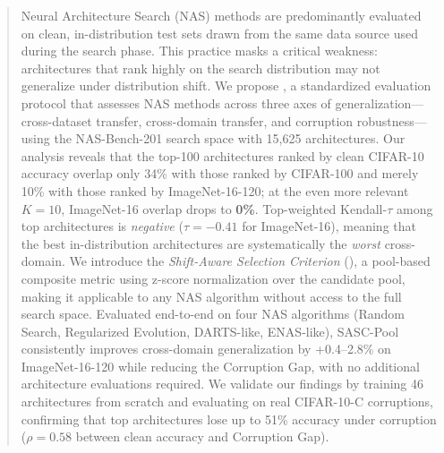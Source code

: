 \begin{abstract}
Neural Architecture Search (NAS) methods are predominantly evaluated on clean, in-distribution test sets drawn from the same data source used during the search phase.
This practice masks a critical weakness: architectures that rank highly on the search distribution may not generalize under distribution shift.
We propose \method, a standardized evaluation protocol that assesses NAS methods across three axes of generalization---cross-dataset transfer, cross-domain transfer, and corruption robustness---using the NAS-Bench-201 search space with 15,625 architectures.
Our analysis reveals that the top-100 architectures ranked by clean CIFAR-10 accuracy overlap only 34\% with those ranked by CIFAR-100 and merely 10\% with those ranked by ImageNet-16-120; at the even more relevant $K{=}10$, ImageNet-16 overlap drops to \textbf{0\%}.
Top-weighted Kendall-$\tau$ among top architectures is \emph{negative} ($\tau = -0.41$ for ImageNet-16), meaning that the best in-distribution architectures are systematically the \emph{worst} cross-domain.
We introduce the \emph{Shift-Aware Selection Criterion} (\sasc), a pool-based composite metric using z-score normalization over the candidate pool, making it applicable to any NAS algorithm without access to the full search space.
Evaluated end-to-end on four NAS algorithms (Random Search, Regularized Evolution, DARTS-like, ENAS-like), SASC-Pool consistently improves cross-domain generalization by +0.4--2.8\% on ImageNet-16-120 while reducing the Corruption Gap, with no additional architecture evaluations required.
We validate our findings by training 46 architectures from scratch and evaluating on real CIFAR-10-C corruptions, confirming that top architectures lose up to 51\% accuracy under corruption ($\rho = 0.58$ between clean accuracy and Corruption Gap).
\end{abstract}
